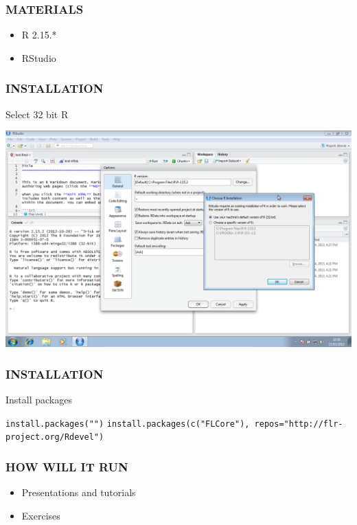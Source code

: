 \documentclass[ignorenonframetext,]{beamer}
\begin{document}
\begin{frame}\frametitle{MATERIALS}

\begin{itemize}[<+->]
\item
  R 2.15.*
\item
  RStudio
\end{itemize}
\end{frame}

\begin{frame}\frametitle{INSTALLATION}

\begin{block}{Select 32 bit R}

\includegraphics[keepaspectratio, width=\textwidth]{graphics/RStudio.png}

\end{block}

\end{frame}

\begin{frame}[fragile]\frametitle{INSTALLATION}

\begin{block}{Install packages}

\texttt{install.packages("")}
\texttt{install.packages(c("FLCore"), repos="http://flr-project.org/Rdevel")}

\end{block}

\end{frame}

\begin{frame}\frametitle{HOW WILL IT RUN}

\begin{itemize}[<+->]
\item
  Presentations and tutorials
\item
  Exercises
\end{itemize}
\end{frame}
\end{document}
